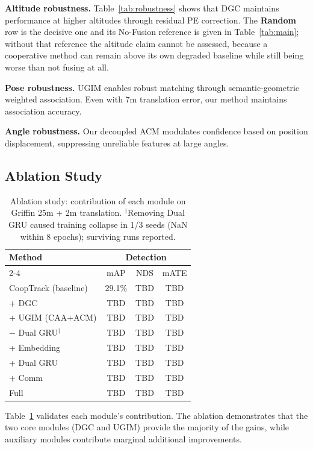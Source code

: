 \documentclass[9.5pt,twocolumn,a4paper]{IEEEtran}
\begin{document}
\textbf{Altitude robustness.} Table~\ref{tab:robustness} shows that DGC maintains performance at higher altitudes through residual PE correction. The \textbf{Random} row is the decisive one and its No-Fusion reference is given in Table~\ref{tab:main}; without that reference the altitude claim cannot be assessed, because a cooperative method can remain above its own degraded baseline while still being worse than not fusing at all.

\textbf{Pose robustness.} UGIM enables robust matching through semantic-geometric weighted association. Even with 7m translation error, our method maintains association accuracy.

\textbf{Angle robustness.} Our decoupled ACM modulates confidence based on position displacement, suppressing unreliable features at large angles.

\subsection{Ablation Study}

\begin{table}[htbp]
    \centering
    \caption{Ablation study: contribution of each module on Griffin 25m + 2m translation. $^\dagger$Removing Dual GRU caused training collapse in 1/3 seeds (NaN within 8 epochs); surviving runs reported.}
    \begin{tabular}{l|ccc}
        \toprule
        \multirow{2}{*}{Method} & \multicolumn{3}{c}{Detection} \\
        \cline{2-4}
        & mAP & NDS & mATE \\
        \midrule
        CoopTrack (baseline) & 29.1\% & TBD & TBD \\
        + DGC & TBD & TBD & TBD \\
        + UGIM (CAA+ACM) & TBD & TBD & TBD \\
        $-$ Dual GRU$^\dagger$ & TBD & TBD & TBD \\
        + Embedding & TBD & TBD & TBD \\
        + Dual GRU & TBD & TBD & TBD \\
        + Comm & TBD & TBD & TBD \\
        \midrule
        Full & TBD & TBD & TBD \\
        \bottomrule
    \end{tabular}
    \label{tab:ablation}
\end{table}

Table~\ref{tab:ablation} validates each module's contribution. The ablation demonstrates that the two core modules (DGC and UGIM) provide the majority of the gains, while auxiliary modules contribute marginal additional improvements.
\end{document}
